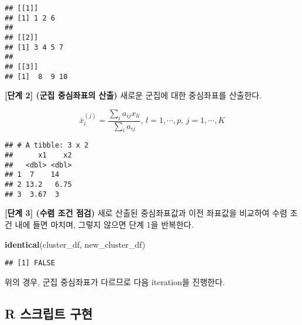 \documentclass[]{book}
\newenvironment{Shaded}{\begin{snugshade}}{\end{snugshade}}
\newcommand{\ControlFlowTok}[1]{\textcolor[rgb]{0.13,0.29,0.53}{\textbf{#1}}}
\newcommand{\DecValTok}[1]{\textcolor[rgb]{0.00,0.00,0.81}{#1}}
\newcommand{\KeywordTok}[1]{\textcolor[rgb]{0.13,0.29,0.53}{\textbf{#1}}}
\newcommand{\NormalTok}[1]{#1}
\newcommand{\OperatorTok}[1]{\textcolor[rgb]{0.81,0.36,0.00}{\textbf{#1}}}
\newcommand{\StringTok}[1]{\textcolor[rgb]{0.31,0.60,0.02}{#1}}
\begin{document}
\begin{verbatim}
## [[1]]
## [1] 1 2 6
## 
## [[2]]
## [1] 3 4 5 7
## 
## [[3]]
## [1]  8  9 10
\end{verbatim}

\textbf{{[}단계 2{]} (군집 중심좌표의 산출)} 새로운 군집에 대한 중심좌표를 산출한다.

\begin{equation*}
\bar{x}^{(j)}_l = \frac{\sum_{i} a_{ij} x_{li}}{\sum_{i} a_{ij}}, \, l = 1, \cdots, p, \, j = 1, \cdots, K
\end{equation*}

\begin{Shaded}
\end{Shaded}

\begin{verbatim}
## # A tibble: 3 x 2
##      x1    x2
##   <dbl> <dbl>
## 1  7    14   
## 2 13.2   6.75
## 3  3.67  3
\end{verbatim}

\textbf{{[}단계 3{]} (수렴 조건 점검)} 새로 산출된 중심좌표값과 이전 좌표값을 비교하여 수렴 조건 내에 들면 마치며, 그렇지 않으면 단계 1을 반복한다.

\begin{Shaded}
\begin{Highlighting}[]
\KeywordTok{identical}\NormalTok{(cluster_df, new_cluster_df)}
\end{Highlighting}
\end{Shaded}

\begin{verbatim}
## [1] FALSE
\end{verbatim}

위의 경우, 군집 중심좌표가 다르므로 다음 iteration을 진행한다.

\hypertarget{kmeans-user-defined-functions}{%
\subsection{R 스크립트 구현}\label{kmeans-user-defined-functions}}
\end{document}
